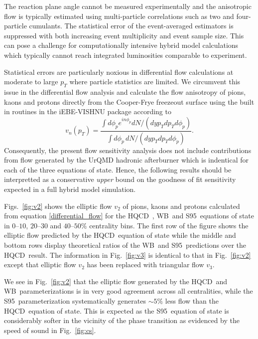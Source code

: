 \documentclass[aps,prc,reprint,amsmath,nofootinbib,superscriptaddress]{revtex4-1}
\newcommand{\hotqcd}{HQCD~}
\newcommand{\wb}{WB~}
\newcommand{\spv}{S95~}
\begin{document}
The reaction plane angle cannot be measured experimentally and the anisotropic flow is typically estimated using multi-particle correlations such as two and four-particle cumulants. The statistical error of the event-averaged estimators is suppressed with both increasing event multiplicity and event sample size. This can pose a challenge for computationally intensive hybrid model calculations which typically cannot reach integrated luminosities comparable to experiment. 

Statistical errors are particularly noxious in differential flow calculations at moderate to large $p_T$ where particle statistics are limited. We circumvent this issue in the differential flow analysis and calculate the flow anisotropy of pions, kaons and protons directly from the Cooper-Frye freezeout surface using the built in routines in the iEBE-VISHNU package according to
\begin{equation}
 \label{differential_flow}
 v_n(p_T) = \frac{\int d\phi_p e^{i n \phi_p} dN/(dy p_T dp_T d\phi_p)}{\int d\phi_p\, dN/(dy p_T dp_T d\phi_p)}.
\end{equation}
Consequently, the present flow sensitivity analysis does not include contributions from flow generated by the UrQMD hadronic afterburner which is indentical for each of the three equations of state. Hence, the following
results should be interpretted as a conservative \emph{upper} bound on the goodness of fit sensitivity expected in a full hybrid model simulation.

Figs.~\ref{fig:v2} shows the elliptic flow $v_2$ of pions, kaons and protons calculated from equation \eqref{differential_flow} for the \hotqcd, \wb and \spv equations of state in $0$--$10$, $20$--$30$ and $40$--$50\%$ centrality bins. 
The first row of the figure shows the elliptic flow predicted by the \hotqcd equation of state while the middle and bottom rows display theoretical ratios of the \wb and \spv predictions over the \hotqcd result. The information
in Fig.~\ref{fig:v3} is identical to that in Fig.~\ref{fig:v2} except that elliptic flow $v_2$ has been replaced with triangular flow $v_3$.

We see in Fig.~\ref{fig:v2} that the elliptic flow generated by the \hotqcd and \wb parameterizations is in very good agreement across all centralities, while the \spv parameterization systematically generates $\sim \! 5\%$ less flow than the \hotqcd equation of state. This is expected as the \spv equation of state is considerably softer in the vicinity of the phase transition as evidenced by the speed of sound in Fig.~\ref{fig:cs}. 
\end{document}
